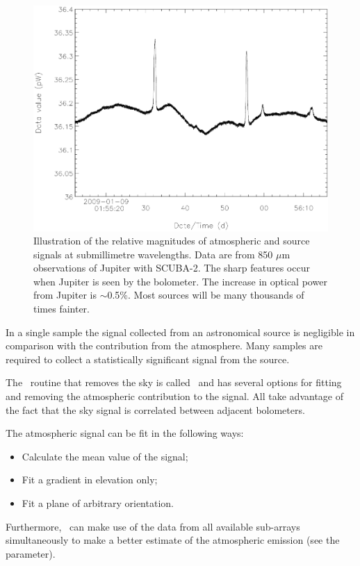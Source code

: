 \documentclass[oneside,11pt]{starlink}
\begin{document}
\begin{figure}[htb]
  \begin{center}
    \includegraphics[width=150mm]{sun258_submmsignal}
    \caption{Illustration of the relative magnitudes of atmospheric
      and source signals at submillimetre wavelengths. Data are from
      850 $\mu$m observations of Jupiter with SCUBA-2. The sharp
      features occur when Jupiter is seen by the bolometer. The
      increase in optical power from Jupiter is $\sim$0.5\%. Most
      sources will be many thousands of times fainter.}
    \label{fig:signal}
  \end{center}
\end{figure}

In a single sample the signal collected from an astronomical source is
negligible in comparison with the contribution from the
atmosphere. Many samples are required to collect a statistically
significant signal from the source.

The \SMURF\ routine that removes the sky is called \remsky\ and has
several options for fitting and removing the atmospheric contribution
to the signal. All take advantage of the fact that the sky signal is
correlated between adjacent bolometers.

The atmospheric signal can be fit in the following ways:
\begin{itemize}
\item Calculate the mean value of the signal;
\item Fit a gradient in elevation only;
\item Fit a plane of arbitrary orientation.
\end{itemize}
Furthermore, \remsky\ can make use of the data from all available
sub-arrays simultaneously to make a better estimate of the atmospheric
emission (see the  parameter).
\end{document}
